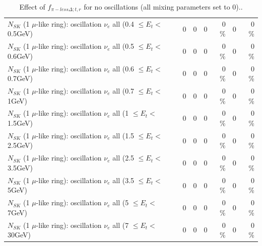 \begin{table}
\begin{tabular}{| l | r | r | r  r | r  r |}
$N_{SK}$ (1 $\mu$-like ring): oscillation $\nu_{e}$ all (0.4 $\leq E_{t} <$ 0.5GeV) &               0 &               0 &               0 &        0 \%  &               0 &        0 \%  \\ 
$N_{SK}$ (1 $\mu$-like ring): oscillation $\nu_{e}$ all (0.5 $\leq E_{t} <$ 0.6GeV) &               0 &               0 &               0 &        0 \%  &               0 &        0 \%  \\ 
$N_{SK}$ (1 $\mu$-like ring): oscillation $\nu_{e}$ all (0.6 $\leq E_{t} <$ 0.7GeV) &               0 &               0 &               0 &        0 \%  &               0 &        0 \%  \\ 
$N_{SK}$ (1 $\mu$-like ring): oscillation $\nu_{e}$ all (0.7 $\leq E_{t} <$ 1GeV) &               0 &               0 &               0 &        0 \%  &               0 &        0 \%  \\ 
$N_{SK}$ (1 $\mu$-like ring): oscillation $\nu_{e}$ all (1 $\leq E_{t} <$ 1.5GeV) &               0 &               0 &               0 &        0 \%  &               0 &        0 \%  \\ 
$N_{SK}$ (1 $\mu$-like ring): oscillation $\nu_{e}$ all (1.5 $\leq E_{t} <$ 2.5GeV) &               0 &               0 &               0 &        0 \%  &               0 &        0 \%  \\ 
$N_{SK}$ (1 $\mu$-like ring): oscillation $\nu_{e}$ all (2.5 $\leq E_{t} <$ 3.5GeV) &               0 &               0 &               0 &        0 \%  &               0 &        0 \%  \\ 
$N_{SK}$ (1 $\mu$-like ring): oscillation $\nu_{e}$ all (3.5 $\leq E_{t} <$ 5GeV) &               0 &               0 &               0 &        0 \%  &               0 &        0 \%  \\ 
 $N_{SK}$ (1 $\mu$-like ring): oscillation $\nu_{e}$ all (5 $\leq E_{t} <$ 7GeV) &               0 &               0 &               0 &        0 \%  &               0 &        0 \%  \\ 
$N_{SK}$ (1 $\mu$-like ring): oscillation $\nu_{e}$ all (7 $\leq E_{t} <$ 30GeV) &               0 &               0 &               0 &        0 \%  &               0 &        0 \%  \\ 
\hline
\hline
\end{tabular}
\caption{ Effect of $f_{\pi-less\Delta; t, r}$ for no oscillations (all mixing parameters set to 0).. }
\label{tab:num_xsec_pilessdelta_1RmuT_3f_osc_t13:0}
\end{table}
\clearpage
